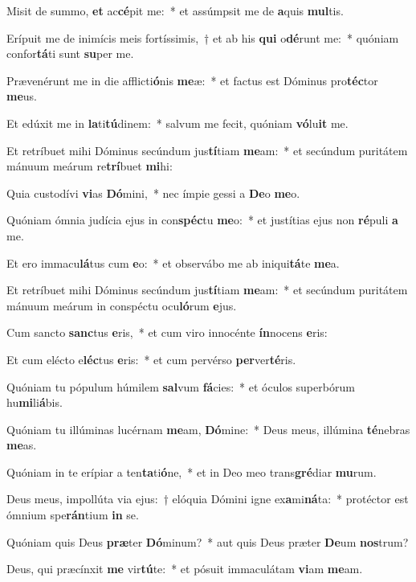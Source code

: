\item Misit de summo, \textbf{et} ac\textbf{cé}pit me:~* et assúmpsit me de \textbf{a}quis \textbf{mul}tis.
\item Erípuit me de inimícis meis fortíssimis,~† et ab his \textbf{qui} o\textbf{dé}runt me:~* quóniam confor\textbf{tá}ti sunt \textbf{su}per me.
\item Prævenérunt me in die afflicti\textbf{ó}nis \textbf{me}æ:~* et factus est Dóminus pro\textbf{téc}tor \textbf{me}us.
\item Et edúxit me in \textbf{la}ti\textbf{tú}dinem:~* salvum me fecit, quóniam \textbf{vó}lu\textbf{it} me.
\item Et retríbuet mihi Dóminus secúndum jus\textbf{tí}tiam \textbf{me}am:~* et secúndum puritátem mánuum meárum re\textbf{trí}buet \textbf{mi}hi:
\item Quia custodívi \textbf{vi}as \textbf{Dó}mini,~* nec ímpie gessi a \textbf{De}o \textbf{me}o.
\item Quóniam ómnia judícia ejus in con\textbf{spéc}tu \textbf{me}o:~* et justítias ejus non \textbf{ré}puli \textbf{a} me.
\item Et ero immacu\textbf{lá}tus cum \textbf{e}o:~* et observábo me ab iniqui\textbf{tá}te \textbf{me}a.
\item Et retríbuet mihi Dóminus secúndum jus\textbf{tí}tiam \textbf{me}am:~* et secúndum puritátem mánuum meárum in conspéctu ocu\textbf{ló}rum \textbf{e}jus.
\item Cum sancto \textbf{sanc}tus \textbf{e}ris,~* et cum viro innocénte \textbf{ín}nocens \textbf{e}ris:
\item Et cum elécto e\textbf{léc}tus \textbf{e}ris:~* et cum pervérso \textbf{per}ver\textbf{té}ris.
\item Quóniam tu pópulum húmilem \textbf{sal}vum \textbf{fá}cies:~* et óculos superbórum hu\textbf{mi}li\textbf{á}bis.
\item Quóniam tu illúminas lucérnam \textbf{me}am, \textbf{Dó}mine:~* Deus meus, illúmina \textbf{té}nebras \textbf{me}as.
\item Quóniam in te erípiar a ten\textbf{ta}ti\textbf{ó}ne,~* et in Deo meo trans\textbf{gré}diar \textbf{mu}rum.
\item Deus meus, impollúta via ejus:~† elóquia Dómini igne ex\textbf{a}mi\textbf{ná}ta:~* protéctor est ómnium spe\textbf{rán}tium \textbf{in} se.
\item Quóniam quis Deus \textbf{præ}ter \textbf{Dó}minum?~* aut quis Deus præter \textbf{De}um \textbf{nos}trum?
\item Deus, qui præcínxit \textbf{me} vir\textbf{tú}te:~* et pósuit immaculátam \textbf{vi}am \textbf{me}am.

